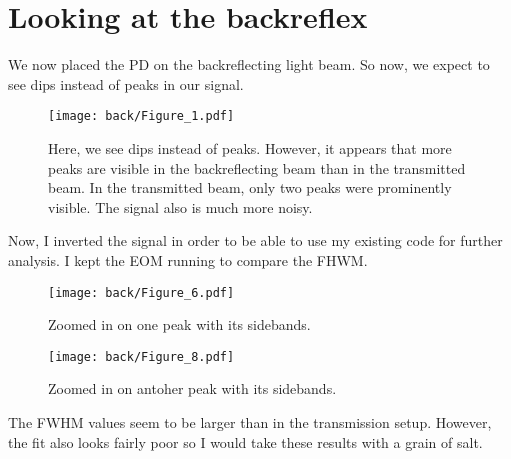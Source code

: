 \section{Looking at the backreflex}
We now placed the PD on the backreflecting light beam. So now, we expect to see dips instead of peaks in our signal.


\begin{figure}[htbp]
    \centering
    \texttt{[image: back/Figure\_1.pdf]}
    \caption{Here, we see dips instead of peaks. However, it appears that more peaks are visible in the backreflecting beam than in the transmitted beam. In the transmitted beam, only two peaks were prominently visible. The signal also is much more noisy.}
\end{figure}
Now, I inverted the signal in order to be able to use my existing code for further analysis. I kept the EOM running to compare the FHWM.

\begin{figure}[htbp]
    \centering
    \texttt{[image: back/Figure\_6.pdf]}
    \caption{Zoomed in on one peak with its sidebands.}
\end{figure}
\begin{figure}[htbp]
    \centering
    \texttt{[image: back/Figure\_8.pdf]}
    \caption{Zoomed in on antoher peak with its sidebands.}
\end{figure}

The FWHM values seem to be larger than in the transmission setup. However, the fit also looks fairly poor so I would take these results with a grain of salt.
